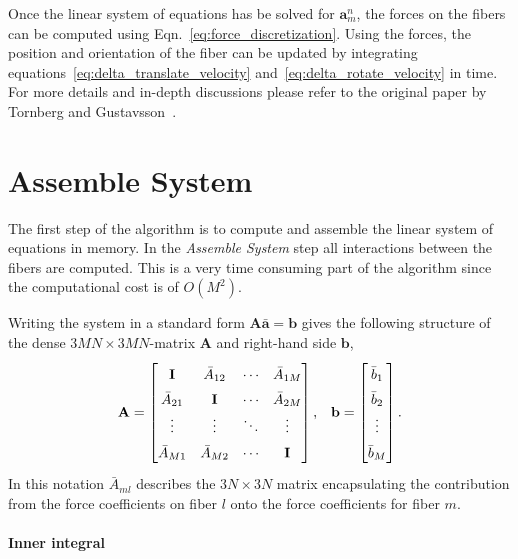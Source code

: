 Once the linear system of equations has be solved for $\mathbf{a}_m^n$, the forces on the fibers can be computed using Eqn.~\eqref{eq:force_discretization}. Using the forces, the position and orientation of the fiber can be updated by integrating equations~\eqref{eq:delta_translate_velocity} and~\eqref{eq:delta_rotate_velocity} in 
time. For more details and in-depth discussions please refer to the original paper by Tornberg and Gustavsson~\cite{Tornberg2006}.

\section{Assemble System}

The first step of the algorithm is to compute and assemble the linear system of equations in memory. In the \emph{Assemble System} step all interactions between the fibers are computed. This is a very time consuming part of the algorithm since the computational cost is of $O(M^2)$.

Writing the system in a standard form $\mathbf{A}\mathbf{\bar{a}}=\mathbf{b}$ gives the following structure of the dense $3MN\times3MN$-matrix $\mathbf{A}$ and right-hand side $\mathbf{b}$,
\begin{equation}
  \label{eq:matrix_structure}
  \renewcommand\arraystretch{1.5}
  \mathbf{A} =
  \begin{bmatrix}
    \mathbf{I} & \bar{A}_{12} & \cdots & \bar{A}_{1M} \\
    \bar{A}_{21} & \mathbf{I} & \cdots & \bar{A}_{2M} \\
    \vdots & \vdots & \ddots & \vdots \\
    \bar{A}_{M1} & \bar{A}_{M2} & \cdots & \mathbf{I}
  \end{bmatrix} \text{,} \quad \mathbf{b} =
  \begin{bmatrix}
    \bar{b}_{1} \\
    \bar{b}_{2} \\
    \vdots \\
    \bar{b}_{M} \\
  \end{bmatrix} \text{.}
\end{equation}
In this notation $\bar{A}_{ml}$ describes the $3N\times3N$ matrix encapsulating the contribution from the force coefficients on fiber $l$ onto the force coefficients for fiber $m$.

\paragraph{Inner integral}

